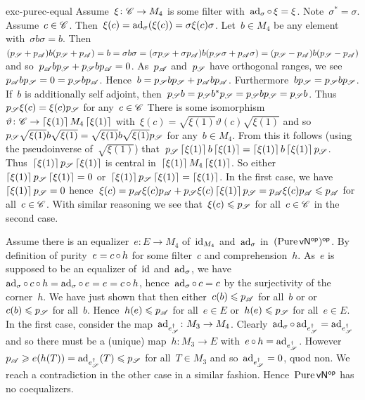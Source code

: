 \begin{solution}{exc-purec-equal}%
   Assume~$\xi\colon \mathscr{C} \to M_4$ is some filter
    with~$\mathrm{ad}_\sigma \mathop{\circ} \xi = \xi$.
    Note~$\sigma^* = \sigma$.
    Assume~$c \in \mathscr{C}$.
    Then~$\xi(c) = \mathrm{ad}_\sigma(\xi (c)) = \sigma \xi(c) \sigma$.
Let~$b \in M_4$ be any element with~$\sigma b \sigma = b$.
    Then~$
    (p_{\mathscr{S}} + p_{\mathscr{A}}) b (p_{\mathscr{S}} +p_{\mathscr{A}})
        = b = \sigma b \sigma
  =  (\sigma p_{\mathscr{S}} + \sigma p_{\mathscr{A}}) b (p_{\mathscr{S}}  \sigma +p_{\mathscr{A}} \sigma)
  =  ( p_{\mathscr{S}} -  p_{\mathscr{A}}) b (p_{\mathscr{S}}  -p_{\mathscr{A}} )$
    and so~$p_{\mathscr{A}} b p_{\mathscr{S}} + p_{\mathscr{S}} b p_{\mathscr{A}} = 0$.
As~$p_{\mathscr{A}}$ and~$p_{\mathscr{S}}$ have orthogonal ranges,
    we see~$p_{\mathscr{A}} b p_{\mathscr{S}} = 0 = p_{\mathscr{S}} b p_{\mathscr{A}}$.
Hence~$b = p_{\mathscr{S}} b p_{\mathscr{S}} + p_{\mathscr{A}} b p_{\mathscr{A}}$.
Furthermore~$b p_{\mathscr{S}} =
    p_{\mathscr{S}} b p_{\mathscr{S}}$.
If~$b$ is additionally self adjoint, then~$p_{\mathscr{S}} b = 
    p_{\mathscr{S}} b^* p_{\mathscr{S}} =
    p_{\mathscr{S}} b p_{\mathscr{S}} = p_{\mathscr{S}} b$.
Thus~$p_{\mathscr{S}} \xi(c) = \xi(c) p_{\mathscr{S}}$ for any~$c \in \mathscr{C}$
There is some isomorphism~$\vartheta \colon \mathscr{C} \to \left\lceil\xi(1)\right\rceil M_4 \left\lceil\xi(1)\right\rceil$
    with~$\xi(c) = \sqrt{\xi(1)} \vartheta(c) \sqrt{\xi(1)}$
    and so~$ p_{\mathscr{S}} \sqrt{\xi(1)} b \sqrt{\xi(1)} = \sqrt{\xi(1)} b \sqrt{\xi(1)} p_{\mathscr{S}}$
    for any~$b \in M_4$.
    From this it follows (using the pseudoinverse of~$\sqrt{\xi(1)}$)
    that~$
    p_{\mathscr{S}} \left\lceil\xi(1)\right\rceil b  \left\lceil\xi(1)\right\rceil =
     \left\lceil\xi(1)\right\rceil b  \left\lceil\xi(1)\right\rceil  p_{\mathscr{S}}$.
    Thus~$\left\lceil\xi(1)\right\rceil p_{\mathscr{S}}\left\lceil\xi(1)\right\rceil$ is central in~$\left\lceil\xi(1)\right\rceil M_4 \left\lceil\xi(1)\right\rceil$.
So either~$\left\lceil\xi(1)\right\rceil p_{\mathscr{S}} \left\lceil\xi(1)\right\rceil = 0$
    or~$\left\lceil\xi(1)\right\rceil p_{\mathscr{S}} \left\lceil\xi(1)\right\rceil = \left\lceil\xi(1)\right\rceil$.
    In the first case, we have~$\left\lceil\xi(1)\right\rceil p_{\mathscr{S}} = 0$
        hence~$\xi(c) = p_{\mathscr{A}} \xi(c) p_{\mathscr{A}} + p_{\mathscr{S}} \xi(c) \left\lceil\xi(1)\right\rceil p_{\mathscr{S}}
        = p_{\mathscr{A}} \xi(c) p_{\mathscr{A}} \leqslant p_{\mathscr{A}}$ for all~$c \in \mathscr{C} $.
    With similar reasoning we see that~$\xi(c) \leqslant p_{\mathscr{S}}$ for all~$c \in \mathscr{C}$
        in the second case.

Assume there is an equalizer~$e\colon E \to M_4$
    of~$\mathrm{id}_{M_4}$ and~$\mathrm{ad}_\sigma$ in~$(\operatorname{Pure} {\mathsf{vN}}{^{\mathsf{op}}})^{\mathsf{op}}$.
    By definition of purity~$e = c \mathop{\circ} h$ for some filter~$c$ and comprehension~$h$.
As~$e$ is supposed to be an equalizer of~$\mathrm{id}$ and~$\mathrm{ad}_\sigma$,
    we have~$\mathrm{ad}_\sigma \mathop{\circ} c \mathop{\circ} h = \mathrm{ad}_\sigma \mathop{\circ} e = e = c \mathop{\circ} h$,
    hence~$\mathrm{ad}_\sigma \mathop{\circ} c = c$ by the surjectivity of the corner~$h$.
We have just shown that then
        either~$c(b) \leqslant p_{\mathscr{A}}$ for all~$b$ or
        or~$c(b) \leqslant p_{\mathscr{S}}$ for all~$b$.
    Hence~$h(e) \leqslant p_{\mathscr{A}}$ for all~$e \in E$
        or~$h(e) \leqslant p_{\mathscr{S}}$ for all~$e \in E$.
    In the first case, consider the map~$\mathrm{ad}_{e^\dagger_{\mathscr{S}}} \colon M_3 \to M_4$.
    Clearly~$\mathrm{ad}_\sigma \mathop{\circ} \mathrm{ad}_{e^\dagger_{\mathscr{S}}}
     = \mathrm{ad}_{e^\dagger_{\mathscr{S}}}$
     and so there must be a (unique) map~$h\colon M_3 \to E$
     with~$e \mathop{\circ} h = \mathrm{ad}_{e^\dagger_{\mathscr{S}}}$.
    However~$p_{\mathscr{A}} \geqslant e(h(T)) = \mathrm{ad}_{e^\dagger_{\mathscr{S}}}(T) \leqslant p_{\mathscr{S}}$
        for all~$T \in M_3$
        and so~$\mathrm{ad}_{e^\dagger_{\mathscr{S}}} = 0$, quod non.
    We reach a contradiction in the other case in a similar fashion.
    Hence~$\operatorname{Pure} {\mathsf{vN}}{^{\mathsf{op}}}$ has no coequalizers.
\end{solution}

